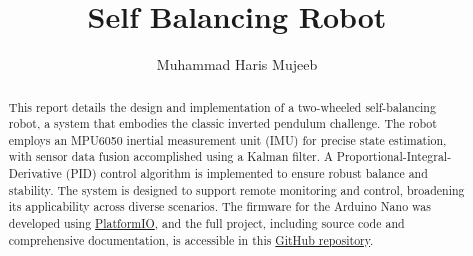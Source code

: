 \documentclass{article}
\title{Self Balancing Robot}
\author{Muhammad Haris Mujeeb}
\begin{document}
\maketitle

\begin{abstract}
This report details the design and implementation of a two-wheeled self-balancing robot, a system that embodies the classic inverted pendulum challenge. The robot employs an MPU6050 inertial measurement unit (IMU) for precise state estimation, with sensor data fusion accomplished using a Kalman filter. A Proportional-Integral-Derivative (PID) control algorithm is implemented to ensure robust balance and stability. The system is designed to support remote monitoring and control, broadening its applicability across diverse scenarios. The firmware for the Arduino Nano was developed using \href{https://platformio.org/}{PlatformIO}, and the full project, including source code and comprehensive documentation, is accessible in this \href{https://github.com/haris-mujeeb/Self-Balancing-Robot}{GitHub repository}.
\end{abstract}

\thispagestyle{empty}
\tableofcontents
\listoffigures
\listoftables
\newpage










%
%



%
%



\end{document}
